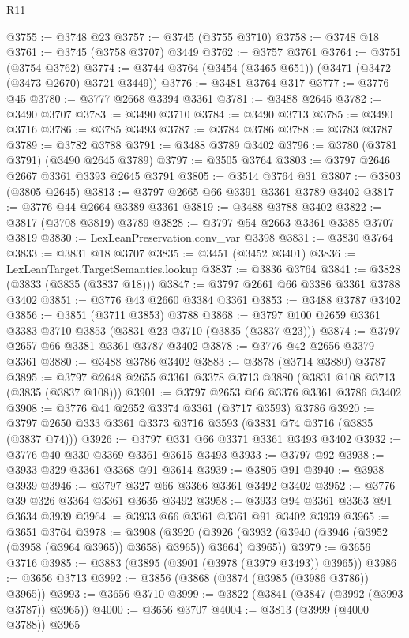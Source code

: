 \begin{lexlean}{R11}
\begin{coremodule}
@3755 := @3748 @23
@3757 := @3745 (@3755 @3710)
@3758 := @3748 @18
@3761 := @3745 (@3758 @3707) @3449
@3762 := @3757 @3761
@3764 := @3751 (@3754 @3762)
@3774 := @3744 @3764 (@3454 (@3465 @651)) (@3471 (@3472 (@3473 @2670) @3721 @3449))
@3776 := @3481 @3764 @317
@3777 := @3776 @45
@3780 := @3777 @2668 @3394 @3361
@3781 := @3488 @2645
@3782 := @3490 @3707
@3783 := @3490 @3710
@3784 := @3490 @3713
@3785 := @3490 @3716
@3786 := @3785 @3493
@3787 := @3784 @3786
@3788 := @3783 @3787
@3789 := @3782 @3788
@3791 := @3488 @3789 @3402
@3796 := @3780 (@3781 @3791) (@3490 @2645 @3789)
@3797 := @3505 @3764
@3803 := @3797 @2646 @2667 @3361 @3393 @2645 @3791
@3805 := @3514 @3764 @31
@3807 := @3803 (@3805 @2645)
@3813 := @3797 @2665 @66 @3391 @3361 @3789 @3402
@3817 := @3776 @44 @2664 @3389 @3361
@3819 := @3488 @3788 @3402
@3822 := @3817 (@3708 @3819) @3789
@3828 := @3797 @54 @2663 @3361 @3388 @3707 @3819
@3830 := LexLeanPreservation.conv_var @3398
@3831 := @3830 @3764
@3833 := @3831 @18 @3707
@3835 := @3451 (@3452 @3401)
@3836 := LexLeanTarget.TargetSemantics.lookup
@3837 := @3836 @3764
@3841 := @3828 (@3833 (@3835 (@3837 @18)))
@3847 := @3797 @2661 @66 @3386 @3361 @3788 @3402
@3851 := @3776 @43 @2660 @3384 @3361
@3853 := @3488 @3787 @3402
@3856 := @3851 (@3711 @3853) @3788
@3868 := @3797 @100 @2659 @3361 @3383 @3710 @3853 (@3831 @23 @3710 (@3835 (@3837 @23)))
@3874 := @3797 @2657 @66 @3381 @3361 @3787 @3402
@3878 := @3776 @42 @2656 @3379 @3361
@3880 := @3488 @3786 @3402
@3883 := @3878 (@3714 @3880) @3787
@3895 := @3797 @2648 @2655 @3361 @3378 @3713 @3880 (@3831 @108 @3713 (@3835 (@3837 @108)))
@3901 := @3797 @2653 @66 @3376 @3361 @3786 @3402
@3908 := @3776 @41 @2652 @3374 @3361 (@3717 @3593) @3786
@3920 := @3797 @2650 @333 @3361 @3373 @3716 @3593 (@3831 @74 @3716 (@3835 (@3837 @74)))
@3926 := @3797 @331 @66 @3371 @3361 @3493 @3402
@3932 := @3776 @40 @330 @3369 @3361 @3615 @3493
@3933 := @3797 @92
@3938 := @3933 @329 @3361 @3368 @91 @3614
@3939 := @3805 @91
@3940 := @3938 @3939
@3946 := @3797 @327 @66 @3366 @3361 @3492 @3402
@3952 := @3776 @39 @326 @3364 @3361 @3635 @3492
@3958 := @3933 @94 @3361 @3363 @91 @3634 @3939
@3964 := @3933 @66 @3361 @3361 @91 @3402 @3939
@3965 := @3651 @3764
@3978 := @3908
    (@3920 (@3926 (@3932 (@3940 (@3946 (@3952 (@3958 (@3964 @3965)) @3658) @3965)) @3664) @3965))
@3979 := @3656 @3716
@3985 := @3883 (@3895 (@3901 (@3978 (@3979 @3493)) @3965))
@3986 := @3656 @3713
@3992 := @3856 (@3868 (@3874 (@3985 (@3986 @3786)) @3965))
@3993 := @3656 @3710
@3999 := @3822 (@3841 (@3847 (@3992 (@3993 @3787)) @3965))
@4000 := @3656 @3707
@4004 := @3813 (@3999 (@4000 @3788)) @3965

\end{coremodule}
\end{lexlean}
